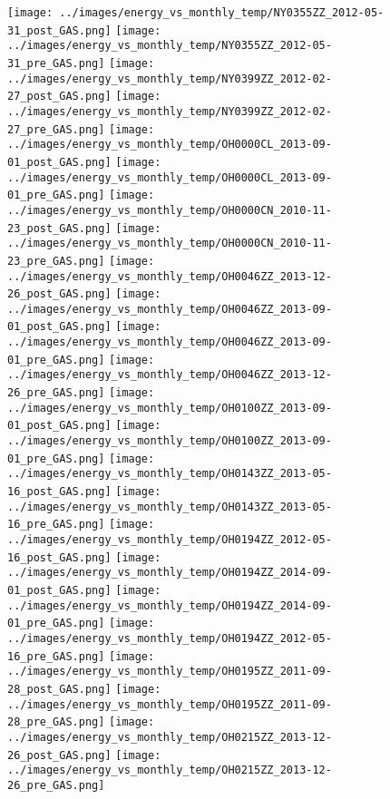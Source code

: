 \clearpage
\begin{figure}
\centering
\texttt{[image: ../images/energy\_vs\_monthly\_temp/NY0355ZZ\_2012-05-31\_post\_GAS.png]}
\texttt{[image: ../images/energy\_vs\_monthly\_temp/NY0355ZZ\_2012-05-31\_pre\_GAS.png]}
\texttt{[image: ../images/energy\_vs\_monthly\_temp/NY0399ZZ\_2012-02-27\_post\_GAS.png]}
\texttt{[image: ../images/energy\_vs\_monthly\_temp/NY0399ZZ\_2012-02-27\_pre\_GAS.png]}
\texttt{[image: ../images/energy\_vs\_monthly\_temp/OH0000CL\_2013-09-01\_post\_GAS.png]}
\texttt{[image: ../images/energy\_vs\_monthly\_temp/OH0000CL\_2013-09-01\_pre\_GAS.png]}
\texttt{[image: ../images/energy\_vs\_monthly\_temp/OH0000CN\_2010-11-23\_post\_GAS.png]}
\texttt{[image: ../images/energy\_vs\_monthly\_temp/OH0000CN\_2010-11-23\_pre\_GAS.png]}
\texttt{[image: ../images/energy\_vs\_monthly\_temp/OH0046ZZ\_2013-12-26\_post\_GAS.png]}
\texttt{[image: ../images/energy\_vs\_monthly\_temp/OH0046ZZ\_2013-09-01\_post\_GAS.png]}
\texttt{[image: ../images/energy\_vs\_monthly\_temp/OH0046ZZ\_2013-09-01\_pre\_GAS.png]}
\texttt{[image: ../images/energy\_vs\_monthly\_temp/OH0046ZZ\_2013-12-26\_pre\_GAS.png]}
\texttt{[image: ../images/energy\_vs\_monthly\_temp/OH0100ZZ\_2013-09-01\_post\_GAS.png]}
\texttt{[image: ../images/energy\_vs\_monthly\_temp/OH0100ZZ\_2013-09-01\_pre\_GAS.png]}
\texttt{[image: ../images/energy\_vs\_monthly\_temp/OH0143ZZ\_2013-05-16\_post\_GAS.png]}
\texttt{[image: ../images/energy\_vs\_monthly\_temp/OH0143ZZ\_2013-05-16\_pre\_GAS.png]}
\texttt{[image: ../images/energy\_vs\_monthly\_temp/OH0194ZZ\_2012-05-16\_post\_GAS.png]}
\texttt{[image: ../images/energy\_vs\_monthly\_temp/OH0194ZZ\_2014-09-01\_post\_GAS.png]}
\texttt{[image: ../images/energy\_vs\_monthly\_temp/OH0194ZZ\_2014-09-01\_pre\_GAS.png]}
\texttt{[image: ../images/energy\_vs\_monthly\_temp/OH0194ZZ\_2012-05-16\_pre\_GAS.png]}
\texttt{[image: ../images/energy\_vs\_monthly\_temp/OH0195ZZ\_2011-09-28\_post\_GAS.png]}
\texttt{[image: ../images/energy\_vs\_monthly\_temp/OH0195ZZ\_2011-09-28\_pre\_GAS.png]}
\texttt{[image: ../images/energy\_vs\_monthly\_temp/OH0215ZZ\_2013-12-26\_post\_GAS.png]}
\texttt{[image: ../images/energy\_vs\_monthly\_temp/OH0215ZZ\_2013-12-26\_pre\_GAS.png]}
\end{figure}
